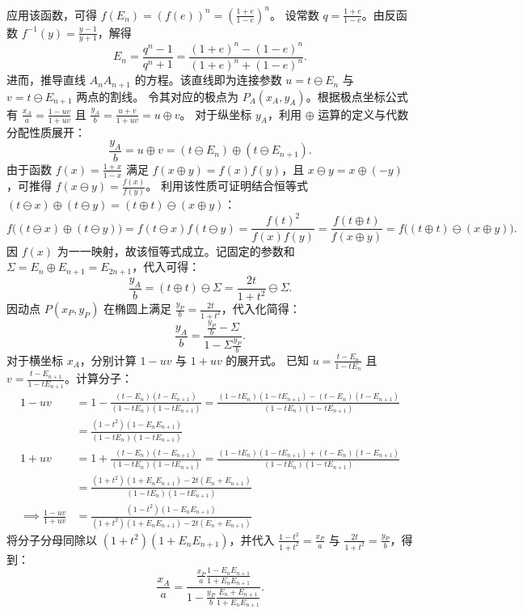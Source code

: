 \begin{solution}
应用该函数，可得 $f(E_n) = (f(e))^n = \left(\frac{1+e}{1-e}\right)^n$。
设常数 $q = \frac{1+e}{1-e}$。由反函数 $f^{-1}(y) = \frac{y-1}{y+1}$，解得
\[ E_n = \frac{ q^n - 1 }{ q^n + 1 } = \frac{(1+e)^n - (1-e)^n}{(1+e)^n + (1-e)^n}. \]
进而，推导直线 $A_n A_{n+1}$ 的方程。该直线即为连接参数 $u = t \ominus E_n$ 与 $v = t \ominus E_{n+1}$ 两点的割线。
令其对应的极点为 $P_A(x_A, y_A)$。根据极点坐标公式有 $\frac{x_A}{a} = \frac{1-uv}{1+uv}$ 且 $\frac{y_A}{b} = \frac{u+v}{1+uv} = u \oplus v$。
对于纵坐标 $y_A$，利用 $\oplus$ 运算的定义与代数分配性质展开：
\[ \frac{y_A}{b} = u \oplus v = (t \ominus E_n) \oplus (t \ominus E_{n+1}). \]
由于函数 $f(x) = \frac{1+x}{1-x}$ 满足 $f(x \oplus y) = f(x)f(y)$，且 $x \ominus y = x \oplus (-y)$，可推得 $f(x \ominus y) = \frac{f(x)}{f(y)}$。
利用该性质可证明结合恒等式 $(t \ominus x) \oplus (t \ominus y) = (t \oplus t) \ominus (x \oplus y)$：
\[ f\big((t \ominus x) \oplus (t \ominus y)\big) = f(t \ominus x)f(t \ominus y) = \frac{f(t)^2}{f(x)f(y)} = \frac{f(t \oplus t)}{f(x \oplus y)} = f\big((t \oplus t) \ominus (x \oplus y)\big). \]
因 $f(x)$ 为一一映射，故该恒等式成立。记固定的参数和 $\Sigma = E_n \oplus E_{n+1} = E_{2n+1}$，代入可得：
\[ \frac{y_A}{b} = (t \oplus t) \ominus \Sigma = \frac{2t}{1+t^2} \ominus \Sigma. \]
因动点 $P(x_P, y_P)$ 在椭圆上满足 $\frac{y_P}{b} = \frac{2t}{1+t^2}$，代入化简得：
\[ \frac{y_A}{b} = \frac{\frac{y_P}{b} - \Sigma}{1 - \Sigma\frac{y_P}{b}}. \]
对于横坐标 $x_A$，分别计算 $1-uv$ 与 $1+uv$ 的展开式。
已知 $u = \frac{t-E_n}{1-tE_n}$ 且 $v = \frac{t-E_{n+1}}{1-tE_{n+1}}$。计算分子：
\begin{align*}
1-uv &= 1 - \frac{(t-E_n)(t-E_{n+1})}{(1-tE_n)(1-tE_{n+1})} = \frac{(1-tE_n)(1-tE_{n+1}) - (t-E_n)(t-E_{n+1})}{(1-tE_n)(1-tE_{n+1})} \\
&= \frac{(1-t^2)(1-E_n E_{n+1})}{(1-tE_n)(1-tE_{n+1})}\\
 1+uv &= 1 + \frac{(t-E_n)(t-E_{n+1})}{(1-tE_n)(1-tE_{n+1})} = \frac{(1-tE_n)(1-tE_{n+1}) + (t-E_n)(t-E_{n+1})}{(1-tE_n)(1-tE_{n+1})} \\
 &= \frac{(1+t^2)(1+E_n E_{n+1}) - 2t(E_n+E_{n+1})}{(1-tE_n)(1-tE_{n+1})}\\
\implies \frac{1-uv}{1+uv} &= \frac{(1-t^2)(1-E_n E_{n+1})}{(1+t^2)(1+E_n E_{n+1}) - 2t(E_n+E_{n+1})}
\end{align*}
将分子分母同除以 $(1+t^2)(1+E_n E_{n+1})$，并代入 $\frac{1-t^2}{1+t^2} = \frac{x_P}{a}$ 与 $\frac{2t}{1+t^2} = \frac{y_P}{b}$，得到：
\[ \frac{x_A}{a} = \frac{ \frac{x_P}{a} \frac{1-E_n E_{n+1}}{1+E_n E_{n+1}} }{ 1 - \frac{y_P}{b} \frac{E_n+E_{n+1}}{1+E_n E_{n+1}} }. \]

\end{solution}
